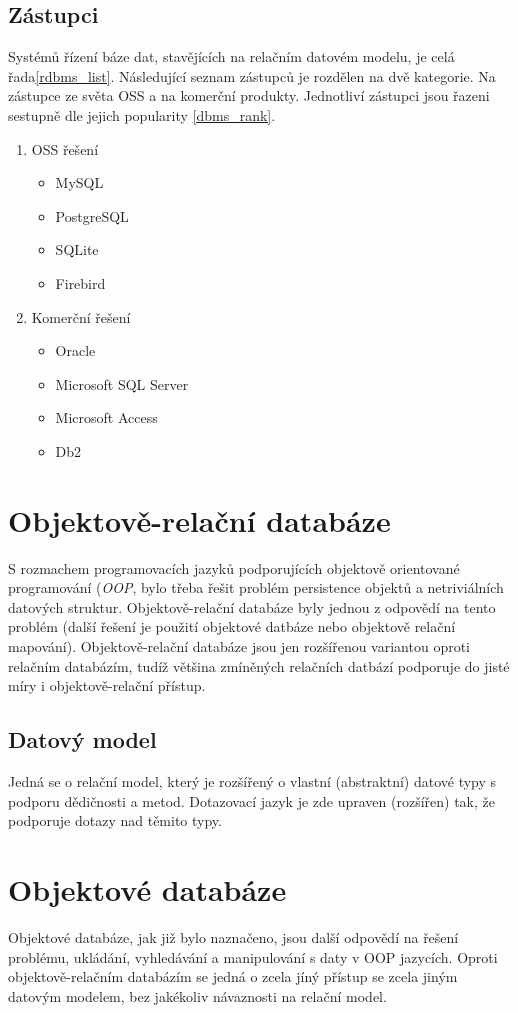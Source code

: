 \subsection{Zástupci}
Systémů řízení báze dat, stavějících na relačním datovém modelu, je celá řada\cref{rdbms_list}. Následující seznam zástupců je rozdělen na dvě kategorie. Na zástupce ze světa OSS a na komerční produkty. Jednotliví zástupci jsou řazeni sestupně dle jejich popularity \cref{dbms_rank}.
\begin{enumerate}
  \item OSS řešení
  \begin{itemize}
    \item MySQL
    \item PostgreSQL
    \item SQLite
    \item Firebird
  \end{itemize}
  \item Komerční řešení
  \begin{itemize}
    \item Oracle
    \item Microsoft SQL Server
    \item Microsoft Access
    \item Db2
  \end{itemize}
\end{enumerate}
\section{Objektově-relační databáze}
S rozmachem programovacích jazyků podporujících objektově orientované programování (\emph{OOP}, bylo třeba řešit problém persistence objektů a netriviálních datových struktur. Objektově-relační databáze byly jednou z odpovědí na tento problém (další řešení je použití objektové datbáze nebo objektově relační mapování). Objektově-relační databáze jsou jen rozšířenou variantou oproti relačním databázím, tudíž většina zmíněných relačních datbází podporuje do jisté míry i objektově-relační přístup.
\subsection{Datový model}
Jedná se o relační model, který je rozšířený o vlastní (abstraktní) datové typy s podporu dědičnosti a metod. Dotazovací jazyk je zde upraven (rozšířen) tak, že podporuje dotazy nad těmito typy.\cite[s.~945--964]{korth:dbsc}

\section{Objektové databáze}
Objektové databáze, jak již bylo naznačeno, jsou další odpovědí na řešení problému, ukládání, vyhledávání a manipulování s daty v OOP jazycích. Oproti objektově-relačním databázím se jedná o zcela jíný přístup se zcela jiným datovým modelem, bez jakékoliv návaznosti na relační model.

